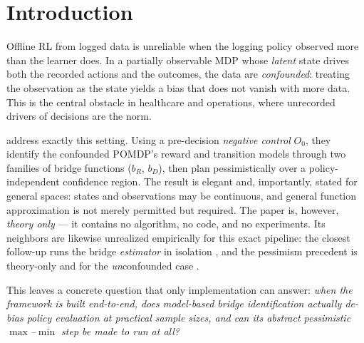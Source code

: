 \documentclass{article}
\theoremstyle{plain}
\theoremstyle{definition}
\begin{document}
\section{Introduction}
\label{sec:intro}

Offline RL from logged data is unreliable when the logging policy observed more
than the learner does. In a partially observable MDP whose \emph{latent} state
drives both the recorded actions and the outcomes, the data are
\emph{confounded}: treating the observation as the state yields a bias that does
not vanish with more data. This is the central obstacle in healthcare and
operations, where unrecorded drivers of decisions are the norm.

\citet{hong2024} address exactly this setting. Using a pre-decision
\emph{negative control} $O_0$, they identify the confounded POMDP's reward and
transition models through two families of bridge functions ($b_R$, $b_D$), then
plan pessimistically over a policy-independent confidence region. The result is
elegant and, importantly, stated for general spaces: states and observations may
be continuous, and general function approximation is not merely permitted but
required. The paper is, however, \emph{theory only} --- it contains no algorithm,
no code, and no experiments. Its neighbors are likewise unrealized empirically
for this exact pipeline: the closest follow-up runs the bridge \emph{estimator}
in isolation \citep{venkatesh2026}, and the pessimism precedent is theory-only
and for the \emph{un}confounded case \citep{guo2022}.

This leaves a concrete question that only implementation can answer: \emph{when
the framework is built end-to-end, does model-based bridge identification
actually de-bias policy evaluation at practical sample sizes, and can its
abstract pessimistic $\max$--$\min$ step be made to run at all?}
\end{document}

